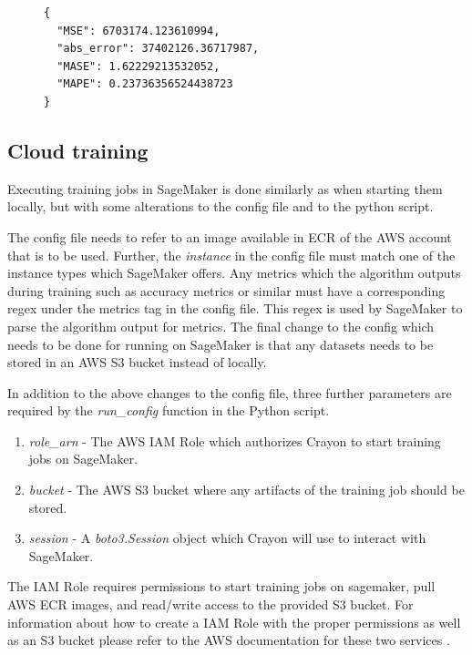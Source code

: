 \begin{figure}
  \begin{lstlisting}[label={output:local_job_output}, caption=Example of a training job output file such as \textit{metrics.json} or \textit{agg\_metrics.json}]
{
  "MSE": 6703174.123610994,
  "abs_error": 37402126.36717987,
  "MASE": 1.62229213532052,
  "MAPE": 0.23736356524438723
}
\end{lstlisting}
\end{figure}


\subsection{Cloud training}
\label{sec:cloud_training}
Executing training jobs in SageMaker is done similarly as when starting them locally, but with some alterations to the config file and to the python script.

The config file needs to refer to an image available in ECR of the AWS account that is to be used. Further, the \textit{instance} in the config file must match one of the instance types which SageMaker offers. Any metrics which the algorithm outputs during training such as accuracy metrics or similar must have a corresponding regex under the metrics tag in the config file. This regex is used by SageMaker to parse the algorithm output for metrics. The final change to the config which needs to be done for running on SageMaker is that any datasets needs to be stored in an AWS S3 bucket instead of locally.

In addition to the above changes to the config file, three further parameters are required by the \textit{run\_config} function in the Python script.

\begin{enumerate}
  \item \textit{role\_arn} - The AWS IAM Role  which authorizes Crayon to start training jobs on SageMaker.
  \item \textit{bucket} - The AWS S3 bucket where any artifacts of the training job should be stored.
  \item \textit{session} - A \textit{boto3.Session} object which Crayon will use to interact with SageMaker.
\end{enumerate}

The IAM Role requires permissions to start training jobs on sagemaker, pull AWS ECR images, and read/write access to the provided S3 bucket. For information about how to create a IAM Role with the proper permissions as well as an S3 bucket please refer to the AWS documentation for these two services \cite{iam_website,s3_website}.

